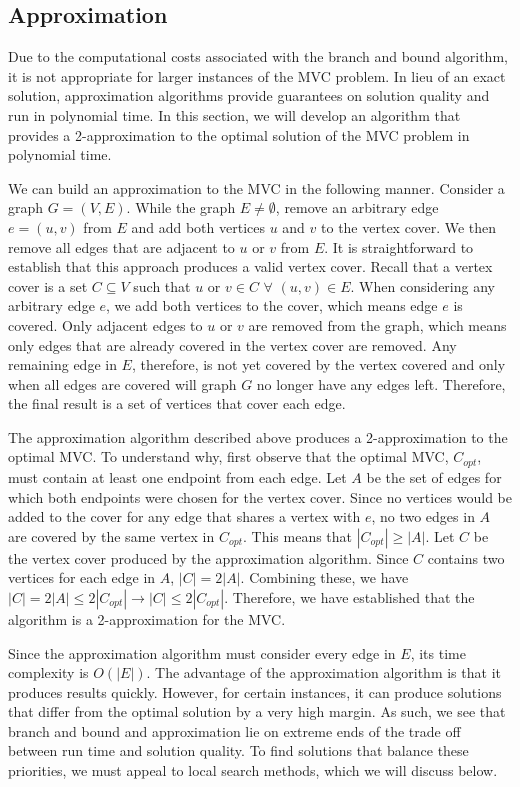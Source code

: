 \documentclass{sig-alternate-05-2015}
\begin{document}
\subsection{Approximation}
Due to the computational costs associated with the branch and bound algorithm, it is not appropriate for larger instances of the MVC problem. In lieu of an exact solution, approximation algorithms provide guarantees on solution quality and run in polynomial time. In this section, we will develop an algorithm that provides a 2-approximation to the optimal solution of the MVC problem in polynomial time.
\par
We can build an approximation to the MVC in the following manner. Consider a graph $G=(V,E)$. While the graph $E \neq \emptyset $, remove an arbitrary edge $e=(u,v)$ from $E$ and add both vertices $u$ and $v$ to the vertex cover.  We then remove all edges that are adjacent to $u$ or $v$ from $E$. It is straightforward to establish that this approach produces a valid vertex cover. Recall that a vertex cover is a set $C \subseteq V$ such that $u$ or $v \in C$ $\forall$ $(u,v) \in E$. When considering any arbitrary edge $e$, we add both vertices to the cover, which means edge $e$ is covered.  Only adjacent edges to $u$ or $v$ are removed from the graph, which means only edges that are already covered in the vertex cover are removed.  Any remaining edge in $E$, therefore, is not yet covered by the vertex covered and only when all edges are covered will graph $G$ no longer have any edges left. Therefore, the final result is a set of vertices that cover each edge.
\par
The approximation algorithm described above produces a 2-approximation to the optimal MVC. To understand why, first observe that the optimal MVC, $C_{opt}$, must contain at least one endpoint from each edge. Let $A$ be the set of edges for which both endpoints were chosen for the vertex cover. Since no vertices would be added to the cover for any edge that shares a vertex with $e$, no two edges in $A$ are covered by the same vertex in $C_{opt}$. This means that $|C_{opt}| \geq |A|$.  Let $C$ be the vertex cover produced by the approximation algorithm. Since $C$ contains two vertices for each edge in $A$, $|C|=2|A|$. Combining these, we have $|C|=2|A|\leq 2|C_{opt}| \rightarrow |C| \leq 2|C_{opt}|$. Therefore, we have established that the algorithm is a 2-approximation for the MVC.
\par
Since the approximation algorithm must consider every edge in $E$, its time complexity is $O(|E|)$. The advantage of the approximation algorithm is that it produces results quickly. However, for certain instances, it can produce solutions that differ from the optimal solution by a very high margin. As such, we see that branch and bound and approximation lie on extreme ends of the trade off between run time and solution quality. To find solutions that balance these priorities, we must appeal to local search methods, which we will discuss below.
\end{document}
